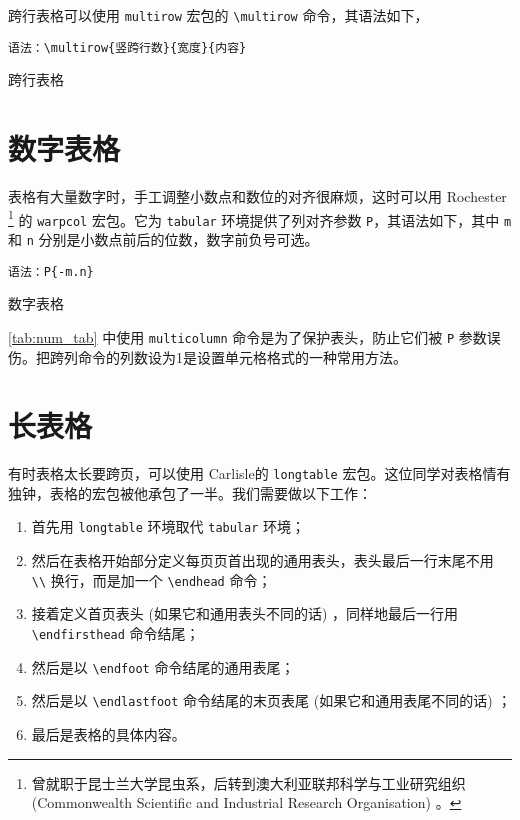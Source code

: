 跨行表格可以使用 \texttt{multirow} 宏包的 \verb|\multirow| 命令，其语法如下，

\verb|语法：\multirow{竖跨行数}{宽度}{内容}|

\begin{example}[htbp]
\caption{跨行表格}
\label{tab:multirow_tab}
\end{example}

\section{数字表格}

表格有大量数字时，手工调整小数点和数位的对齐很麻烦，这时可以用 Rochester\indexRochester{} \footnote{曾就职于昆士兰大学昆虫系，后转到澳大利亚联邦科学与工业研究组织 (Commonwealth Scientific and Industrial Research Organisation) 。} 的 \texttt{warpcol} 宏包\citep{Rochester_warpcol}。它为 \texttt{tabular} 环境提供了列对齐参数 \texttt{P}，其语法如下，其中 \texttt{m} 和 \texttt{n} 分别是小数点前后的位数，数字前负号可选。

\verb|语法：P{-m.n}|

\begin{example}[htbp]
\caption{数字表格}
\label{tab:num_tab}
\end{example}

\autoref{tab:num_tab} 中使用 \verb|multicolumn| 命令是为了保护表头，防止它们被 \texttt{P} 参数误伤。把跨列命令的列数设为1是设置单元格格式的一种常用方法。

\section{长表格}

有时表格太长要跨页，可以使用 Carlisle\indexCarlisle 的 \texttt{longtable} 宏包\citep{Carlisle_longtable}。这位同学对表格情有独钟，表格的宏包被他承包了一半。我们需要做以下工作：

\begin{enumerate}
  \item 首先用 \texttt{longtable} 环境取代 \texttt{tabular} 环境；
  \item 然后在表格开始部分定义每页页首出现的通用表头，表头最后一行末尾不用 \verb|\\| 换行，而是加一个 \verb|\endhead| 命令；
  \item 接着定义首页表头 (如果它和通用表头不同的话) ，同样地最后一行用 \verb|\endfirsthead| 命令结尾；
  \item 然后是以 \verb|\endfoot| 命令结尾的通用表尾；
  \item 然后是以 \verb|\endlastfoot| 命令结尾的末页表尾 (如果它和通用表尾不同的话) ；
  \item 最后是表格的具体内容。
\end{enumerate}

